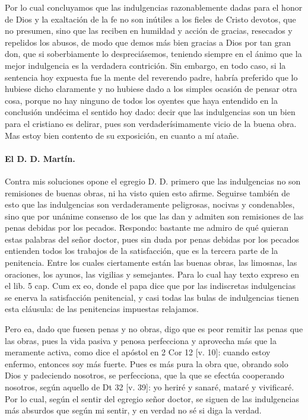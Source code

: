 Por lo cual concluyamos que las indulgencias razonablemente dadas para el honor de Dios y la exaltación de la fe no son inútiles a los fieles de Cristo devotos, que no presumen, sino que las reciben en humildad y acción de gracias, resecados y repelidos los abusos, de modo que demos más bien gracias a Dios por tan gran don, que si soberbiamente lo despreciásemos, teniendo siempre en el ánimo que la mejor indulgencia es la verdadera contrición. Sin embargo, en todo caso, si la sentencia hoy expuesta fue la mente del reverendo padre, habría preferido que lo hubiese dicho claramente y no hubiese dado a los simples ocasión de pensar otra cosa, porque no hay ninguno de todos los oyentes que haya entendido en la conclusión undécima el sentido hoy dado: decir que las indulgencias son un bien para el cristiano es delirar, pues son verdaderísimamente vicio de la buena obra. Mas estoy bien contento de su exposición, en cuanto a mí atañe.

\paragraph*{El D. D. Martín.}

Contra mis soluciones opone el egregio D. D. primero que las indulgencias no son remisiones de buenas obras, ni ha visto quien esto afirme. Seguirse \marginpar{\small[354]} también de esto que las indulgencias son verdaderamente peligrosas, nocivas y condenables, sino que por unánime consenso de los que las dan y admiten son remisiones de las penas debidas por los pecados. Respondo: bastante me admiro de qué quieran estas palabras del señor doctor, pues sin duda por penas debidas por los pecados entienden todos los trabajos de la satisfacción, que es la tercera parte de la penitencia. Entre los cuales ciertamente están las buenas obras, las limosnas, las oraciones, los ayunos, las vigilias y semejantes. Para lo cual hay texto expreso en el lib. 5 cap. Cum ex eo, donde el papa dice que por las indiscretas indulgencias se enerva la satisfacción penitencial, y casi todas las bulas de indulgencias tienen esta cláusula: de las penitencias impuestas relajamos.

Pero ea, dado que fuesen penas y no obras, digo que es peor remitir las penas que las obras, pues la vida pasiva y penosa perfecciona y aprovecha más que la meramente activa, como dice el apóstol en 2 Cor 12 [v. 10]: cuando estoy enfermo, entonces soy más fuerte. Pues es más pura la obra que, obrando solo Dios y padeciendo nosotros, se perfecciona, que la que se efectúa cooperando nosotros, según aquello de Dt 32 [v. 39]: yo heriré y sanaré, mataré y vivificaré. Por lo cual, según el sentir del egregio señor doctor, se siguen de las indulgencias más absurdos que según mi sentir, y en verdad no sé si diga la verdad.

